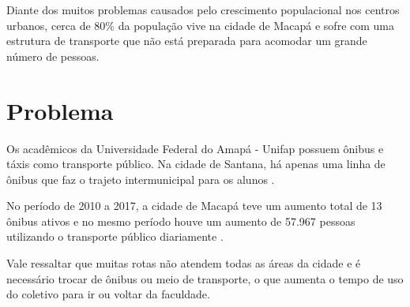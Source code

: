 Diante dos muitos problemas causados pelo crescimento populacional nos centros urbanos, cerca de 80\% da população vive na cidade de Macapá e sofre com uma estrutura de transporte que não está preparada para acomodar um grande número de pessoas.

\section {Problema}
\begin{comment}
	Na cidade de Macapá e Santana, as duas maiores cidade do Amapá, o número de transporte coletivo é baixo,
	existe apenas duas rodovias que interligam as cidades, 
	se locomover se torna difícil \cite{sau2018}. %
	
	Com tantos problemas aparentes causadas pelo grande inchaço populacional que  vive nas áreas urbanas, cerca de 80\% da população das duas cidades reside em áreas urbanas e sofre com a insuficiência do sistema de transporte público oferecido \cite{tostes}.
\end{comment}

Os acadêmicos da Universidade Federal do Amapá - Unifap possuem ônibus e táxis como transporte público. Na cidade de Santana, há apenas uma linha de ônibus que faz o trajeto intermunicipal para os alunos \cite{sau2018}.

No período de 2010 a 2017, a cidade de Macapá teve um aumento total de 13 ônibus ativos e no mesmo período houve um aumento de 57.967 pessoas utilizando o transporte público diariamente \cite{sau2018}.

Vale ressaltar que muitas rotas não atendem todas as áreas da cidade e é necessário trocar de ônibus ou meio de transporte, o que aumenta o tempo de uso do coletivo para ir ou voltar da faculdade.

